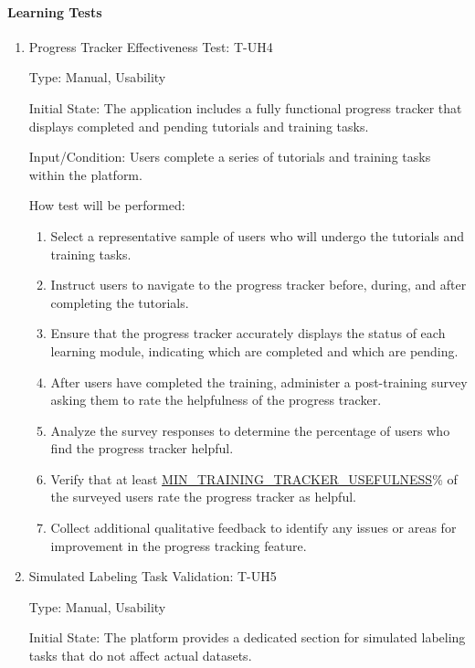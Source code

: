 \documentclass[12pt, titlepage]{article}
\begin{document}
\paragraph{Learning Tests}
\begin{enumerate}

\item{Progress Tracker Effectiveness Test: T-UH4\\}

Type: Manual, Usability

Initial State: The application includes a fully functional progress tracker that displays completed and pending tutorials and training tasks.

Input/Condition: Users complete a series of tutorials and training tasks within the platform.

How test will be performed:
\begin{enumerate}
    \item Select a representative sample of users who will undergo the tutorials and training tasks.
    \item Instruct users to navigate to the progress tracker before, during, and after completing the tutorials.
    \item Ensure that the progress tracker accurately displays the status of each learning module, indicating which are completed and which are pending.
    \item After users have completed the training, administer a post-training survey asking them to rate the helpfulness of the progress tracker.
    \item Analyze the survey responses to determine the percentage of users who find the progress tracker helpful.
    \item Verify that at least \hyperref[MIN_TRAINING_TRACKER_USEFULNESS]{MIN\_TRAINING\_TRACKER\_USEFULNESS}\% of the surveyed users rate the progress tracker as helpful.
    \item Collect additional qualitative feedback to identify any issues or areas for improvement in the progress tracking feature.
\end{enumerate}

\item{Simulated Labeling Task Validation: T-UH5\\}

Type: Manual, Usability

Initial State: The platform provides a dedicated section for simulated labeling tasks that do not affect actual datasets.


\end{enumerate}
\end{document}
